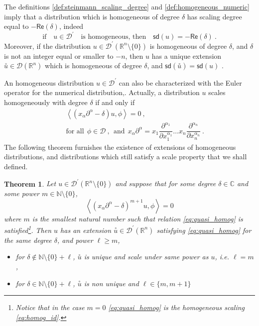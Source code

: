 \documentclass[11pt]{book}
\newcommand{\sd}{\mathsf{sd}}
\renewcommand{\Re}{\mathsf{Re}}
\newcommand{\sm}[1]{\left\langle#1\right\rangle}
\newcommand{\exte}[1]{\overset{\circ}{#1}}
\newcommand{\Dcal}{\mathcal{D}}
\newcommand{\Cbb}{\mathbb{C}}
\newcommand{\Nbb}{\mathbb{N}}
\newcommand{\Rbb}{\mathbb{R}}
\theoremstyle{break}
\newtheorem{theorem}{Theorem}[chapter]
\begin{document}
The definitions \ref{def:steinmann_scaling_degree} and \ref{def:homogeneous_numeric} imply that a distribution which is homogeneous of degree $\delta$ has scaling degree equal to $-\Re(\delta)$, indeed
%
\begin{equation}
\mbox{if} \quad u \in \Dcal^\prime \quad \mbox{is homogeneous, then} \quad \sd(u) = -\Re(\delta) \ .
\end{equation}
%
Moreover, if the distribution $u \in \Dcal^\prime(\Rbb^n\setminus \{0\})$ is homogeneous of degree $\delta$, and $\delta$ is not an integer equal or smaller to $-n$, then $u$ has a unique extension $\exte{u} \in \Dcal(\Rbb^n)$ which is homogeneous of degree $\delta$, and $\sd(\exte{u})=\sd(u)$ \cite{hormander_analysis_1990}.


An homogeneous distribution $u \in \Dcal^\prime$ can also be characterized with the Euler operator for the numerical distribution,. Actually, a distribution $u$ scales homogeneously with degree $\delta$ if and only if 
%
\begin{eqnarray*}
&& \sm{\left(x_\alpha \partial^\alpha - \delta \right) u ,\phi} =  0 \ , \\
&& \mbox{for all} \ \ \phi \in \Dcal \ , \ \ \mbox{and} \ \ x_\alpha \partial^\alpha = x_1 \dfrac{\partial^{\alpha_1}}{\partial x_1^{\alpha_1}} \dots x_n \dfrac{\partial^{\alpha_n}}{\partial x_n^{\alpha_n}} \ .
\end{eqnarray*}
%
The following theorem furnishes the existence of extensions of homogeneous distributions, and distributions which still satisfy a scale property that we shall defined.
%
\begin{theorem}\label{theo:almost_homo_numeric}
Let $u \in \Dcal^\prime(\Rbb^n\setminus\{0\})$ and suppose that for some degree $\delta\in\Cbb$ and some power $m\in\Nbb\setminus\{0\}$, 
%
\begin{equation}
\sm{\left(x_\alpha \partial^\alpha - \delta \right)^{m+1} u , \phi } =  0
\label{eq:quasi_homog}
\end{equation}
%
where $m$ is the smallest natural number such that relation \eqref{eq:quasi_homog} is satisfied\footnote{Notice that in the case $m=0$ \eqref{eq:quasi_homog} is the homogeneous scaling \eqref{eq:homog_id}.}. Then $u$ has an extension $\exte{u}\in\Dcal^\prime(\Rbb^n)$ satisfying \eqref{eq:quasi_homog} for the same degree $\delta$, and power $\ell \geq m$,
%
\begin{itemize}
\item for $\delta \notin \Nbb \setminus \{0\} + \ell$, $\exte{u}$ is unique and scale under same power as $u$, i.e. $\ell=m$,
%
\item for $\delta \in \Nbb \setminus \{0\} + \ell$, $\exte{u}$ is non unique and $\ell\in\{ m , m+1 \}$
\end{itemize}
%
\end{theorem}
\end{document}
